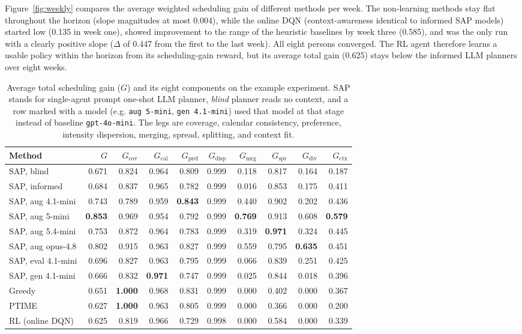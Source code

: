 \documentclass[runningheads]{llncs}
\begin{document}
Figure~\ref{fig:weekly} compares the average weighted scheduling gain of different methods per week. The non-learning methods stay flat throughout the horizon (slope magnitudes at most 0.004), while the online DQN (context-awareness identical to informed SAP models) started low (0.135 in week one), showed improvement to the range of the heuristic baselines by week three (0.585), and was the only run with a clearly positive slope ($\Delta$ of 0.447 from the first to the last week). All eight persons converged. The RL agent therefore learns a usable policy within the horizon from its scheduling-gain reward, but its average total gain (0.625) stays below the informed LLM planners over eight weeks.
\begin{table}[t]
\centering
\caption{Average total scheduling gain ($G$) and its eight components on the example experiment. SAP stands for single-agent prompt one-shot LLM planner, \emph{blind} planner reads no context, and a row marked with a model (e.g. \texttt{aug 5-mini}, \texttt{gen 4.1-mini}) used that model at that stage instead of baseline \texttt{gpt-4o-mini}. The legs are coverage, calendar consistency, preference, intensity dispersion, merging, spread, splitting, and context fit.}
\label{tab:gain}
\setlength{\tabcolsep}{3pt}
\footnotesize
\begin{tabular}{lrrrrrrrrr}
\toprule
Method & $G$ & $G_{\text{cov}}$ & $G_{\text{cal}}$ & $G_{\text{pref}}$ & $G_{\text{disp}}$ & $G_{\text{mrg}}$ & $G_{\text{spr}}$ & $G_{\text{div}}$ & $G_{\text{ctx}}$ \\
\midrule
SAP, blind          & 0.671 & 0.824 & 0.964 & 0.809 & 0.999 & 0.118 & 0.817 & 0.164 & 0.187 \\
SAP, informed       & 0.684 & 0.837 & 0.965 & 0.782 & 0.999 & 0.016 & 0.853 & 0.175 & 0.411 \\
SAP, aug 4.1-mini   & 0.743 & 0.789 & 0.959 & \textbf{0.843} & 0.999 & 0.440 & 0.902 & 0.202 & 0.436 \\
SAP, aug 5-mini     & \textbf{0.853} & 0.969 & 0.954 & 0.792 & 0.999 & \textbf{0.769} & 0.913 & 0.608 & \textbf{0.579} \\
SAP, aug 5.4-mini   & 0.753 & 0.872 & 0.964 & 0.783 & 0.999 & 0.319 & \textbf{0.971} & 0.324 & 0.445 \\
SAP, aug opus-4.8   & 0.802 & 0.915 & 0.963 & 0.827 & 0.999 & 0.559 & 0.795 & \textbf{0.635} & 0.451 \\
SAP, eval 4.1-mini  & 0.696 & 0.827 & 0.963 & 0.795 & 0.999 & 0.066 & 0.839 & 0.251 & 0.425 \\
SAP, gen 4.1-mini   & 0.666 & 0.832 & \textbf{0.971} & 0.747 & 0.999 & 0.025 & 0.844 & 0.018 & 0.396 \\
Greedy              & 0.651 & \textbf{1.000} & 0.968 & 0.831 & 0.999 & 0.000 & 0.402 & 0.000 & 0.367 \\
PTIME               & 0.627 & \textbf{1.000} & 0.963 & 0.805 & 0.999 & 0.000 & 0.366 & 0.000 & 0.200 \\
RL (online DQN)     & 0.625 & 0.819 & 0.966 & 0.729 & 0.998 & 0.000 & 0.584 & 0.000 & 0.339 \\
\bottomrule
\end{tabular}
\end{table}
\end{document}

